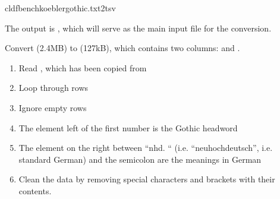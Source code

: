 \documentclass[letterpaper,10pt,english]{sphinxmanual}
\begin{document}
{{{{\begin{sphinxVerbatim}[commandchars=\\\{\}]
cldfbenchkoeblergothic.txt2tsv
\end{sphinxVerbatim}

\sphinxAtStartPar
The output is , which will serve as the main input file
for the conversion.

\label{\detokenize{mkcldf:module-koeblergothiccommands.txt2tsv}}
\sphinxAtStartPar
Convert  (2.4MB) to  (127kB), which
contains two columns:  and .

\begin{fulllineitems}
\label{\detokenize{mkcldf:koeblergothiccommands.txt2tsv.run}}
\pysigstartsignatures
{}
\pysigstopsignatures\begin{enumerate}
%
\item {} 
\sphinxAtStartPar
Read , which has been copied from

\item {} 
\sphinxAtStartPar
Loop through rows

\item {} 
\sphinxAtStartPar
Ignore empty rows

\item {} 
\sphinxAtStartPar
The element left of the first number is the Gothic headword

\item {} 
\sphinxAtStartPar
The element on the right between “nhd. “ (i.e. “neuhochdeutsch”, i.e.
standard German) and the semi\sphinxhyphen{}colon are the meanings in German

\item {} 
\sphinxAtStartPar
Clean the data by removing special characters and brackets with their
contents.


\end{enumerate}
\end{fulllineitems}}}}}
\end{document}

